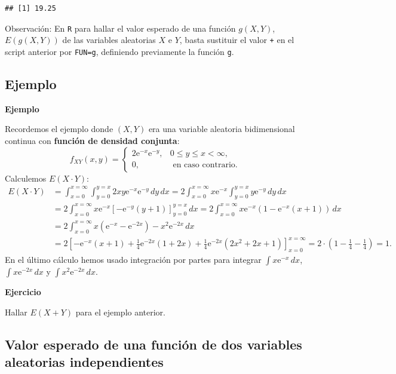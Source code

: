 \documentclass[]{book}
\begin{document}
\begin{verbatim}
## [1] 19.25
\end{verbatim}

Observación:
En \texttt{R} para hallar el valor esperado de una función \(g(X,Y)\), \(E(g(X,Y))\) de las variables aleatorias \(X\) e \(Y\), basta sustituir el valor \texttt{+} en el script anterior por \texttt{FUN=g}, definiendo previamente la función \texttt{g}.

\hypertarget{ejemplo-59}{%
\subsection{Ejemplo}\label{ejemplo-59}}

\textbf{Ejemplo}

Recordemos el ejemplo donde \((X,Y)\) era una variable aleatoria bidimensional continua con \textbf{función de densidad conjunta}:
\[
f_{XY}(x,y)=\begin{cases}
2 \mathrm{e}^{-x}\mathrm{e}^{-y}, & 0\leq y\leq x < \infty,\\
0, & \mbox{ en caso contrario.}
\end{cases}
\]
Calculemos \(E(X\cdot Y)\):
\[
\begin{array}{ll}
E(X\cdot Y) & =\int_{x=0}^{x=\infty} \int_{y=0}^{y=x} 2 x y \mathrm{e}^{-x}\mathrm{e}^{-y}\, dy\, dx=2\int_{x=0}^{x=\infty} x \mathrm{e}^{-x} \int_{y=0}^{y=x}  y \mathrm{e}^{-y}\, dy\, dx \\ & = 2\int_{x=0}^{x=\infty}x \mathrm{e}^{-x} \left[-\mathrm{e}^{-y} (y+1)\right]_{y=0}^{y=x}\, dx =
2\int_{x=0}^{x=\infty}x \mathrm{e}^{-x} \left(1-\mathrm{e}^{-x}(x+1)\right)\, dx \\ &= 2\int_{x=0}^{x=\infty}x\left( \mathrm{e}^{-x}-\mathrm{e}^{-2x}\right)-x^2\mathrm{e}^{-2x}\, dx \\ & =
2\left[-\mathrm{e}^{-x}(x+1)+\frac{1}{4}\mathrm{e}^{-2 x}(1+2x)+\frac{1}{4} \mathrm{e}^{-2 x} \left(2 x^2+2
   x+1\right)\right]_{x=0}^{x=\infty} = 2\cdot \left(1-\frac{1}{4}-\frac{1}{4}\right)=1.
\end{array}
\]
En el último cálculo hemos usado integración por partes para integrar \(\int x\mathrm{e}^{-x}\,dx\), \(\int x\mathrm{e}^{-2x}\,dx\) y \(\int x^2\mathrm{e}^{-2x}\, dx\).

\textbf{Ejercicio}

Hallar \(E(X+Y)\) para el ejemplo anterior.

\hypertarget{valor-esperado-de-una-funciuxf3n-de-dos-variables-aleatorias-independientes}{%
\subsection{Valor esperado de una función de dos variables aleatorias independientes}\label{valor-esperado-de-una-funciuxf3n-de-dos-variables-aleatorias-independientes}}
\end{document}
